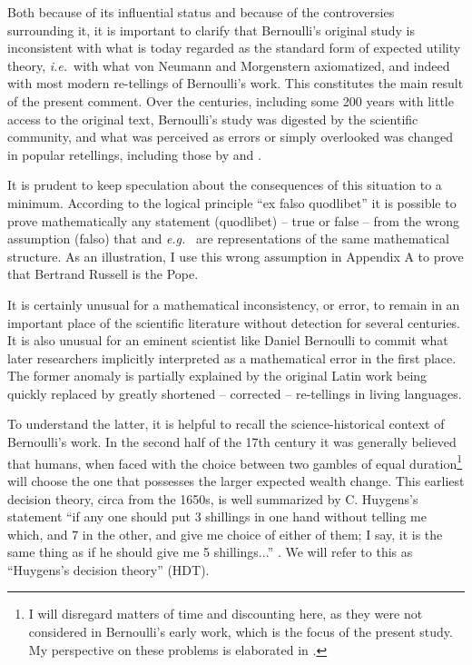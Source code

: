 \documentclass[final]{ectaart}
\newcommand{\ie}{{\it i.e.}\ }
\newcommand{\eg}{{\it e.g.}\ }
\theoremstyle{plain}
\begin{document}
Both because of its influential status and because of the controversies surrounding it, it is important to clarify that Bernoulli's original study is inconsistent with what is today regarded as the standard form of expected utility theory, \ie with what von Neumann and Morgenstern axiomatized, and indeed with most modern re-tellings of Bernoulli's work. This constitutes the main result of the present comment. Over the centuries, including some 200 years with little access to the original text, Bernoulli's study was digested by the scientific community, and what was perceived as errors or simply overlooked was changed in popular retellings, including those by \citet{Laplace1814} and \citet{Todhunter1865}.

It is prudent to keep speculation about the consequences of this situation to a minimum. According to the logical principle ``ex falso quodlibet'' it is possible to prove mathematically any statement (quodlibet) -- true or false -- from the wrong assumption (falso) that \citep{Bernoulli1738} and \eg \citep{vonNeumannMorgenstern1944} are representations of the same mathematical structure. As an illustration, I use this wrong assumption in Appendix A to prove that Bertrand Russell is the Pope. 

It is certainly unusual for a mathematical inconsistency, or error, to remain in an important place of the scientific literature without detection for several centuries. It is also unusual for an eminent scientist like Daniel Bernoulli to commit what later researchers implicitly interpreted as a mathematical error in the first place. The former anomaly is partially explained by the original Latin work being quickly replaced by greatly shortened -- corrected -- re-tellings in living languages. 

To understand the latter, it is helpful to recall the science-historical context of Bernoulli's work. In the second half of the 17th century it was generally believed that humans, when faced with the choice between two gambles of equal duration\footnote{I will disregard matters of time and discounting here, as they were not considered in Bernoulli's early work, which is the focus of the present study. My perspective on these problems is elaborated in \cite{PetersGell-Mann2016}.} will choose the one that possesses the larger expected wealth change. This earliest decision theory, circa from the 1650s, is well summarized by C. Huygens's statement ``if any one should put 3 shillings in one hand without telling me which, and 7 in the other, and give me choice of either of them; I say, it is the same thing as if he should give me 5 shillings...'' \cite{Huygens1657}. We will refer to this as ``Huygens's decision theory'' (HDT). 
\end{document}
